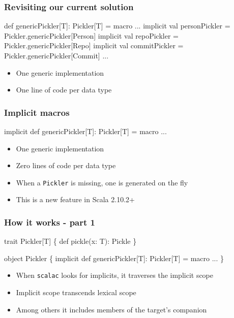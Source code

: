 \documentclass[svgnames,hyperref={bookmarks=false}]{beamer}
\begin{document}
\begin{frame}[fragile]
\frametitle{Revisiting our current solution}

\begin{semiverbatim}
def genericPickler[T]: Pickler[T] = macro ...
implicit val personPickler = Pickler.genericPickler[Person]
implicit val repoPickler = Pickler.genericPickler[Repo]
implicit val commitPickler = Pickler.genericPickler[Commit]
...

\end{semiverbatim}

\begin{itemize}
\item One generic implementation
\item One line of code per data type
\end{itemize}
\end{frame}

\begin{frame}[fragile]
\frametitle{Implicit macros}

\begin{semiverbatim}
\alert{implicit} def genericPickler[T]: Pickler[T] = macro ...





\end{semiverbatim}

\begin{itemize}
\item One generic implementation
\item \alert{Zero} lines of code per data type
\item When a \texttt{Pickler} is missing, one is generated on the fly
\item This is a new feature in Scala 2.10.2+
\end{itemize}
\end{frame}

\begin{frame}[fragile]
\frametitle{How it works - part 1}

\begin{semiverbatim}
trait Pickler[T] \{ def pickle(x: T): Pickle \}

object Pickler \{
  implicit def genericPickler[T]: Pickler[T] = macro ...
\}

\end{semiverbatim}

\begin{itemize}
\item When \texttt{scalac} looks for implicits, it traverses the implicit scope
\item Implicit scope transcends lexical scope
\item Among others it includes members of the target's companion
\end{itemize}
\end{frame}
\end{document}
